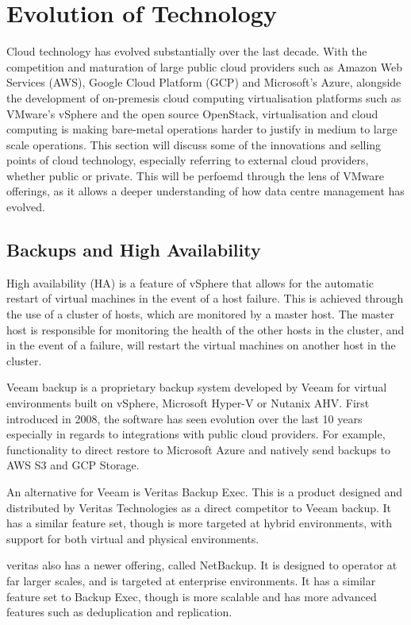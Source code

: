 \section{Evolution of Technology}

Cloud technology has evolved substantially over the last decade. With the competition and maturation of large public cloud providers such as Amazon Web Services (AWS), Google Cloud Platform (GCP) and Microsoft's Azure, alongside the development of on-premesis cloud computing virtualisation platforms such as VMware's vSphere and the open source OpenStack, virtualisation and cloud computing is making bare-metal operations harder to justify in medium to large scale operations. This section will discuss some of the innovations and selling points of cloud technology, especially referring to external cloud providers, whether public or private. This will be perfoemd through the lens of VMware offerings, as it allows a deeper understanding of how data centre management has evolved.

\subsection{Backups and High Availability}

High availability (HA) is a feature of vSphere that allows for the automatic restart of virtual machines in the event of a host failure. This is achieved through the use of a cluster of hosts, which are monitored by a master host. The master host is responsible for monitoring the health of the other hosts in the cluster, and in the event of a failure, will restart the virtual machines on another host in the cluster.

Veeam backup is a proprietary backup system developed by Veeam for virtual environments built on vSphere, Microsoft Hyper-V or Nutanix AHV. First introduced in 2008, the software has seen evolution over the last 10 years especially in regards to integrations with public cloud providers. For example, functionality to direct restore to Microsoft Azure and natively send backups to AWS S3 and GCP Storage.

An alternative for Veeam is Veritas Backup Exec. This is a product designed and distributed by Veritas Technologies as a direct competitor to Veeam backup. It has a similar feature set, though is more targeted at hybrid environments, with support for both virtual and physical environments.

veritas also has a newer offering, called NetBackup. It is designed to operator at far larger scales, and is targeted at enterprise environments. It has a similar feature set to Backup Exec, though is more scalable and has more advanced features such as deduplication and replication.

